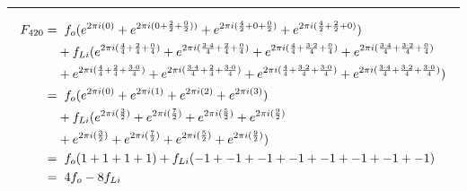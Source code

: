 \documentclass{article}
\begin{document}
\noindent\rule{12cm}{0.4pt}
\begin{align*}
	F_{420} =& \hspace{0.2cm}  f_{o}  (e^{2 \pi i (0)} 
	+ e^{2 \pi i (0 + \frac{2}{2} + \frac{0}{2}))} 
	+ e^{2 \pi i (\frac{4}{2} + 0 + \frac{0}{2})} 
	+ e^{2 \pi i (\frac{4}{2} + \frac{2}{2} + 0)})  \\
	&+ f_{Li} (e^{2 \pi i (\frac{4}{4} + \frac{2}{4} + \frac{0}{4})}  
	+ e^{2 \pi i (\frac{3 \cdot 4}{4} + \frac{2}{4} + \frac{0}{4})} 
	+ e^{2 \pi i (\frac{4}{4} + \frac{3 \cdot 2}{4} + \frac{0}{4})} 
	+ e^{2 \pi i (\frac{3 \cdot 4}{4} + \frac{3 \cdot 2}{4} + \frac{0}{4})} \\
	&+ e^{2 \pi i (\frac{4}{4} + \frac{2}{4} + \frac{3 \cdot 0}{4})}
	+ e^{2 \pi i (\frac{3 \cdot 4}{4} + \frac{2}{4} + \frac{3 \cdot 0}{4})} 
	+ e^{2 \pi i (\frac{4}{4} + \frac{3 \cdot 2}{4} + \frac{3 \cdot 0}{4})} 
	+ e^{2 \pi i (\frac{3 \cdot 4}{4} + \frac{3 \cdot 2}{4} + \frac{3 \cdot 0}{4})}) \\  
	=& \hspace{0.2cm}  f_{o}  (e^{2 \pi i (0)} 
	+ e^{2 \pi i (1)} 
	+ e^{2 \pi i (2)} 
	+ e^{2 \pi i (3)})  \\
	&+ f_{Li} (e^{2 \pi i (\frac{3}{2})}  
	+ e^{2 \pi i (\frac{7}{2})} 
	+ e^{2 \pi i (\frac{5}{2})} 
	+ e^{2 \pi i (\frac{9}{2})} \\
	&+ e^{2 \pi i (\frac{3}{2})}
	+ e^{2 \pi i (\frac{7}{2})} 
	+ e^{2 \pi i (\frac{5}{2})} 
	+ e^{2 \pi i (\frac{9}{2})}) \\
	=& \hspace{0.2cm}  f_{o}  (1  + 1 + 1 + 1) + f_{Li}(-1 + -1 + -1 + -1 + -1 + -1 + -1 + -1) \\
	=& \hspace{0.2cm} 4f_{o}   - 8f_{Li}
\end{align*}
\end{document}
